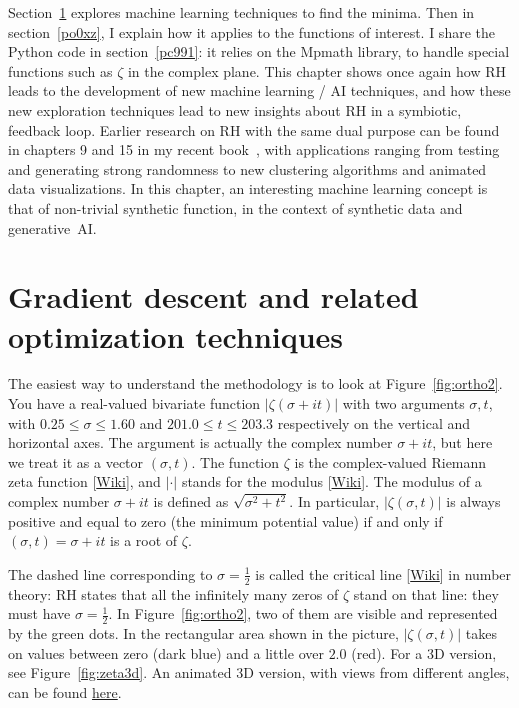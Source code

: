 \documentclass[oneside,10pt]{book}
\begin{document}
Section~\ref{hg21} explores machine learning techniques to find the minima. Then in section~\ref{po0xz}, I explain how it applies to the functions of interest. I share the Python code in section~\ref{pc991}: it relies on the Mpmath library, to handle special functions such as $\zeta$ in the complex plane. This chapter shows once again how RH leads to the development of new machine learning / AI techniques, and how these
 new exploration techniques lead to new insights about RH in a symbiotic, feedback loop. Earlier research on RH with the same dual purpose can be found in chapters 9 and 15 in my recent book~\cite{vgelsevier}, with applications ranging from testing and generating strong randomness
 to new clustering algorithms and animated data visualizations. In this chapter, an interesting machine learning concept is that of non-trivial  synthetic function, in the context of synthetic data and generative~AI.


\section{Gradient descent and related optimization techniques}\label{hg21}

The easiest way to understand the methodology is to look at Figure~\ref{fig:ortho2}. You have a real-valued bivariate function
 $|\zeta(\sigma+it)|$ with two arguments $\sigma, t$, with $0.25\leq \sigma \leq 1.60$ and $201.0\leq t \leq 203.3$ respectively on the vertical and horizontal axes. The argument is actually the complex number $\sigma + it$, but here we treat it as a vector $(\sigma, t)$.
 The function $\zeta$ is the complex-valued \textcolor{index}{Riemann zeta function} [\href{https://en.wikipedia.org/wiki/Riemann_zeta_function}{Wiki}], and $|\cdot|$ stands for the
 \textcolor{index}{modulus} [\href{https://en.wikipedia.org/wiki/Absolute_value#Complex_numbers}{Wiki}].
The modulus of a complex number $\sigma + it$ is defined as $\sqrt{\sigma^2 + t^2}$.
In particular,
$|\zeta(\sigma,t)|$ is always positive and equal to zero (the minimum potential value) if and only if $(\sigma, t) = \sigma + it$ is a root of $\zeta$.


The dashed line corresponding to $\sigma=\frac{1}{2}$ is called the \textcolor{index}{critical line} [\href{https://en.wikipedia.org/wiki/Riemann_hypothesis#Zeros_on_the_critical_line}{Wiki}] in number theory: RH states that all the infinitely many zeros of $\zeta$ stand on that line: they must have $\sigma=\frac{1}{2}$. In Figure~\ref{fig:ortho2}, two of them are visible and represented by the green dots. In the rectangular area shown in the picture, $|\zeta(\sigma,t)|$ takes on values between zero (dark blue) and a little over $2.0$ (red).
 For a 3D version, see Figure~\ref{fig:zeta3d}. An animated 3D version, with views from different angles, can be found
 \href{https://github.com/VincentGranville/Experimental-Math-Number-Theory/blob/main/Images/gradient_3D_rotate_zeta.mp4}{here}.
\end{document}
